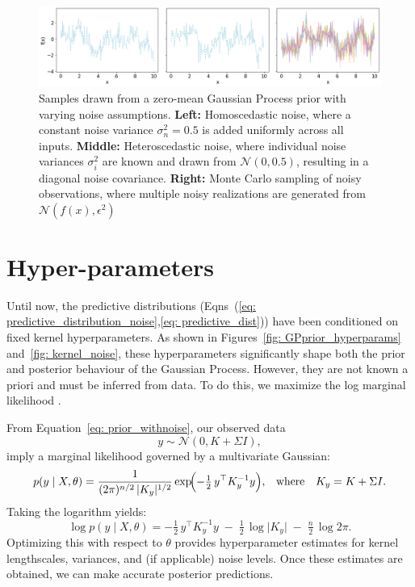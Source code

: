 \documentclass{ucdgradtaughtthesis}
\begin{document}
\begin{figure}[H]
    \centering
    \includegraphics[width=\textwidth]{LatexPlots/1dplots/GPR_noise_comparison.png}
    \caption[Comparing samples taken from a GP with Homoscedastic noise,Heterscedastic noise and monte carlo sampling of the noise.]{Samples drawn from a zero-mean Gaussian Process prior with varying noise assumptions.
    \textbf{Left:} Homoscedastic noise, where a constant noise variance \(\sigma_n^2 = 0.5\) is added uniformly across all inputs.
    \textbf{Middle:} Heteroscedastic noise, where individual noise variances \(\sigma_i^2\) are known and drawn from \(\mathcal{N}(0, 0.5)\), resulting in a diagonal noise covariance.
    \textbf{Right:} Monte Carlo sampling of noisy observations, where multiple noisy realizations are generated from \(\mathcal{N}(f(x), \epsilon^2)\)}
    \label{fig:noise_comparison}
\end{figure}




\section{Hyper-parameters}
\label{sec: Hyper_parameters}
Until now, the predictive distributions (Eqns~(\ref{eq: predictive_distribution_noise},\ref{eq: predictive_dist})) have been conditioned on fixed kernel hyperparameters. As shown in Figures~\ref{fig: GPprior_hyperparams} and~\ref{fig: kernel_noise}, these hyperparameters significantly shape both the prior and posterior behaviour of the Gaussian Process. However, they are not known a priori and must be inferred from data. To do this, we maximize the log marginal likelihood \cite[Ch.~5]{bible}.

From Equation~\ref{eq: prior_withnoise}, our observed data 
\[
y \sim \mathcal{N}(0, K + \Sigma I),
\]
imply a marginal likelihood governed by a multivariate Gaussian:
\[
p(y \mid X, \theta) = \frac{1}{(2\pi)^{n/2} \,\lvert K_y \rvert^{1/2}} 
\exp\!\Bigl(-\tfrac12\,y^\top K_y^{-1} y\Bigr), 
\quad\!\text{where}\quad K_y = K + \Sigma I.
\]
Taking the logarithm yields:
\begin{equation}\label{eq: 5}
\log p(y \mid X, \theta) 
= -\tfrac{1}{2}\,y^\top K_y^{-1}y \;-\; \tfrac{1}{2}\,\log\lvert K_y \rvert \;-\; \tfrac{n}{2}\,\log 2\pi.
\end{equation}
Optimizing this with respect to \(\theta\) provides hyperparameter estimates for kernel lengthscales, variances, and (if applicable) noise levels. Once these estimates are obtained, we can make accurate posterior predictions.
\end{document}
